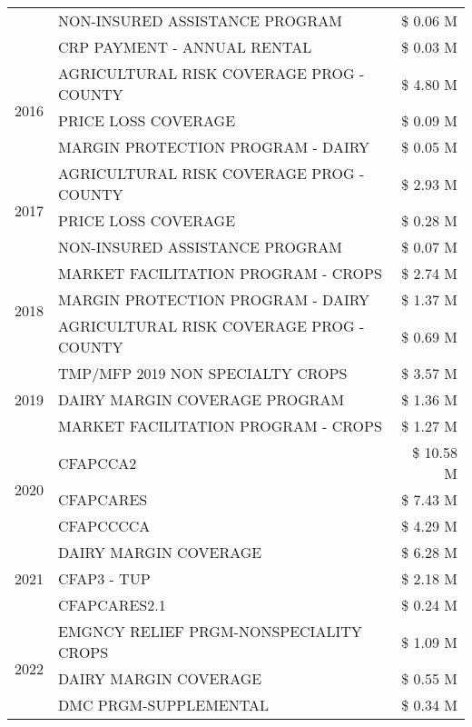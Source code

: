 \begin{tabular}{llr}
 & NON-INSURED ASSISTANCE PROGRAM & \$ 0.06 M \\
 & CRP PAYMENT - ANNUAL RENTAL & \$ 0.03 M \\
\cline{1-3}
\multirow[t]{3}{*}{2016} & AGRICULTURAL RISK COVERAGE PROG - COUNTY & \$ 4.80 M \\
 & PRICE LOSS COVERAGE & \$ 0.09 M \\
 & MARGIN PROTECTION PROGRAM - DAIRY & \$ 0.05 M \\
\cline{1-3}
\multirow[t]{3}{*}{2017} & AGRICULTURAL RISK COVERAGE PROG - COUNTY & \$ 2.93 M \\
 & PRICE LOSS COVERAGE & \$ 0.28 M \\
 & NON-INSURED ASSISTANCE PROGRAM & \$ 0.07 M \\
\cline{1-3}
\multirow[t]{3}{*}{2018} & MARKET FACILITATION PROGRAM - CROPS & \$ 2.74 M \\
 & MARGIN PROTECTION PROGRAM - DAIRY & \$ 1.37 M \\
 & AGRICULTURAL RISK COVERAGE PROG - COUNTY & \$ 0.69 M \\
\cline{1-3}
\multirow[t]{3}{*}{2019} & TMP/MFP 2019 NON SPECIALTY CROPS & \$ 3.57 M \\
 & DAIRY MARGIN COVERAGE PROGRAM & \$ 1.36 M \\
 & MARKET FACILITATION PROGRAM - CROPS & \$ 1.27 M \\
\cline{1-3}
\multirow[t]{3}{*}{2020} & CFAPCCA2 & \$ 10.58 M \\
 & CFAPCARES & \$ 7.43 M \\
 & CFAPCCCCA & \$ 4.29 M \\
\cline{1-3}
\multirow[t]{3}{*}{2021} & DAIRY MARGIN COVERAGE & \$ 6.28 M \\
 & CFAP3 - TUP & \$ 2.18 M \\
 & CFAPCARES2.1 & \$ 0.24 M \\
\cline{1-3}
\multirow[t]{3}{*}{2022} & EMGNCY RELIEF PRGM-NONSPECIALITY CROPS & \$ 1.09 M \\
 & DAIRY MARGIN COVERAGE & \$ 0.55 M \\
 & DMC PRGM-SUPPLEMENTAL & \$ 0.34 M \\
\cline{1-3}
\bottomrule
\end{tabular}

